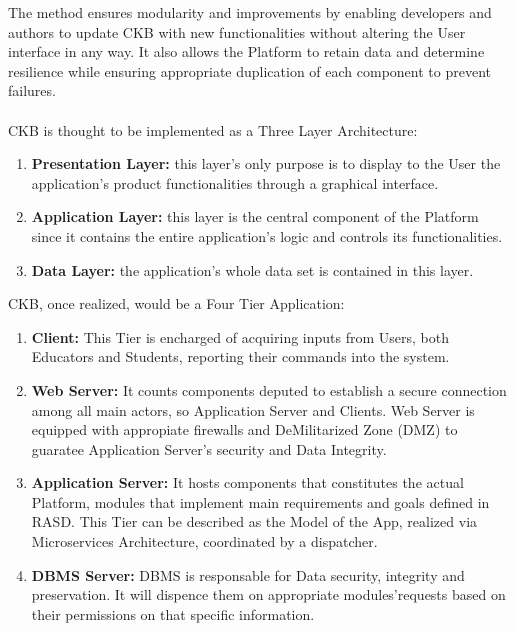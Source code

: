 The method ensures modularity and improvements by enabling developers and authors to update CKB with new functionalities without altering the User interface in any way. It also allows the Platform to retain data and determine 
resilience while ensuring appropriate duplication of each component to prevent failures.\\
\\
CKB is thought to be implemented as a Three Layer Architecture:
\begin{enumerate}[label=$\bullet$]
    \item \textbf{Presentation Layer:} this layer's only purpose is to display to the User the application's product functionalities through a graphical interface.
    \item \textbf{Application Layer:} this layer is the central component of the Platform since it contains the entire application's logic and controls its functionalities.
    \item \textbf{Data Layer:} the application's whole data set is contained in this layer.
\end{enumerate}
CKB, once realized, would be a Four Tier Application:
\begin{enumerate}
    \item \textbf{Client:} This Tier is encharged of acquiring inputs from Users, both Educators and Students, reporting their commands into the system.
    \item \textbf{Web Server:} It counts components deputed to establish a secure connection among all main actors, so Application Server and Clients. Web Server is equipped with appropiate firewalls and DeMilitarized Zone (DMZ) to guaratee Application Server's security and Data Integrity.
    \item \textbf{Application Server:} It hosts components that constitutes the actual Platform, modules that implement main requirements and goals defined in RASD. This Tier can be described as the Model of the App, realized via Microservices Architecture, coordinated by a dispatcher.
    \item \textbf{DBMS Server:} DBMS is responsable for Data security, integrity and preservation. It will dispence them on appropriate modules'requests based on their permissions on that specific information. 
\end{enumerate}
